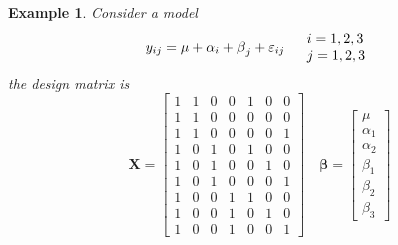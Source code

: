 \documentclass{article}
\newtheorem{example}[theorem]{Example}
\begin{document}
\bigskip

\begin{example}
Consider a model%
\begin{equation*}
y_{ij}=\mu +\alpha _{i}+\beta _{j}+\varepsilon _{ij}\quad 
\begin{tabular}{l}
$i=1,2,3$ \\ 
$j=1,2,3$%
\end{tabular}%
\end{equation*}%
the design matrix is 
\begin{equation*}
\mathbf{X}=\left[ 
\begin{array}{ccccccc}
1 & 1 & 0 & 0 & 1 & 0 & 0 \\ 
1 & 1 & 0 & 0 & 0 & 0 & 0 \\ 
1 & 1 & 0 & 0 & 0 & 0 & 1 \\ 
1 & 0 & 1 & 0 & 1 & 0 & 0 \\ 
1 & 0 & 1 & 0 & 0 & 1 & 0 \\ 
1 & 0 & 1 & 0 & 0 & 0 & 1 \\ 
1 & 0 & 0 & 1 & 1 & 0 & 0 \\ 
1 & 0 & 0 & 1 & 0 & 1 & 0 \\ 
1 & 0 & 0 & 1 & 0 & 0 & 1%
\end{array}%
\right] \quad \mathbf{\beta }=\left[ 
\begin{array}{c}
\mu \\ 
\alpha _{1} \\ 
\alpha _{2} \\ 
\beta _{1} \\ 
\beta _{2} \\ 
\beta _{3}%
\end{array}%
\right]
\end{equation*}
\end{example}
\end{document}
